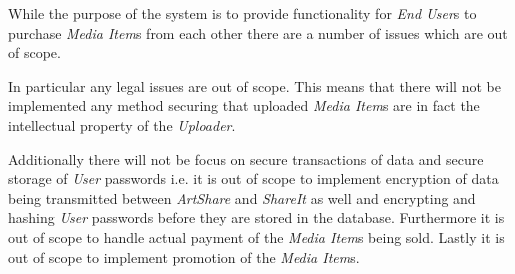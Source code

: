 \documentclass[../report.tex]{subfiles}
\begin{document}
While the purpose of the system is to provide functionality for \textit{End User}s to purchase \textit{Media Item}s from each other there are a number of issues which are out of scope. 

In particular any legal issues are out of scope. This means that there will not be implemented any method securing that uploaded \textit{Media Item}s are in fact the intellectual property of the \textit{Uploader}. 

Additionally there will not be focus on secure transactions of data and secure storage of \textit{User} passwords i.e. it is out of scope to implement encryption of data being transmitted between \textit{ArtShare} and \textit{ShareIt} as well and encrypting and hashing \textit{User} passwords before they are stored in the database. Furthermore it is out of scope to handle actual payment of the \textit{Media Item}s being sold. Lastly it is out of scope to implement promotion of the \textit{Media Item}s.
\end{document}

